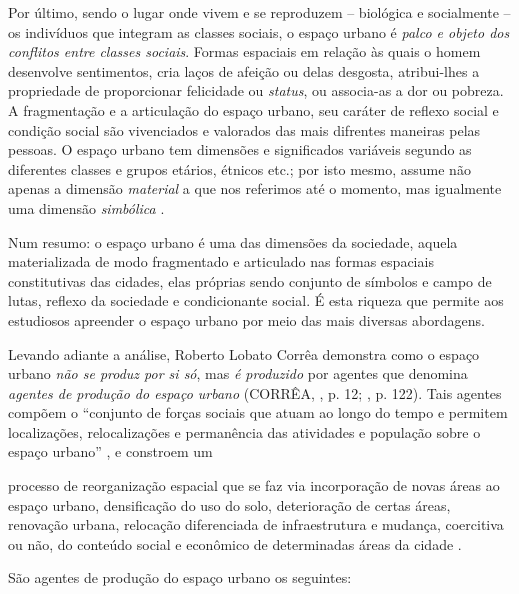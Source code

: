 Por último, sendo o lugar onde vivem e se reproduzem -- biológica e socialmente -- os indivíduos que integram as classes sociais, o espaço urbano é \textit{palco e objeto dos conflitos entre classes sociais}. Formas espaciais em relação às quais o homem desenvolve sentimentos, cria laços de afeição ou delas desgosta, atribui-lhes a propriedade de proporcionar felicidade ou \textit{status}, ou associa-as a dor ou pobreza. A fragmentação e a articulação do espaço urbano, seu caráter de reflexo social e condição social são vivenciados e valorados das mais difrentes maneiras pelas pessoas. O espaço urbano tem dimensões e significados variáveis segundo as diferentes classes e grupos etários, étnicos etc.; por isto mesmo, assume não apenas a dimensão \textit{material} a que nos referimos até o momento, mas igualmente uma dimensão \textit{simbólica} \cite[p.~150-151]{CORREA1997}.

Num resumo: o espaço urbano é uma das dimensões da sociedade, aquela materializada de modo fragmentado e articulado nas formas espaciais constitutivas das cidades, elas próprias sendo conjunto de símbolos e campo de lutas, reflexo da sociedade e condicionante social. É esta riqueza que permite aos estudiosos apreender o espaço urbano por meio das mais diversas abordagens.

Levando adiante a análise, Roberto Lobato Corrêa demonstra como o espaço urbano \textit{não se produz por si só}, mas \textit{é produzido} por agentes que denomina \textit{agentes de produção do espaço urbano} (CORRÊA, \citeyear{CORREA1985espa}, p. 12; \citeyear{CORREA1997}, p. 122). Tais agentes compõem o ``conjunto de forças sociais que atuam ao longo do tempo e permitem localizações, relocalizações e permanência das atividades e população sobre o espaço urbano'' \cite[p.~122]{CORREA1997}, e constroem um

\begin{citacao}
processo de reorganização espacial que se faz via incorporação de novas áreas ao espaço urbano, densificação do uso do solo, deterioração de certas áreas, renovação urbana, relocação diferenciada de infraestrutura e mudança, coercitiva ou não, do conteúdo social e econômico de determinadas áreas da cidade \cite[p.~11]{CORREA1985espa}.
\end{citacao}

São agentes de produção do espaço urbano os seguintes:

